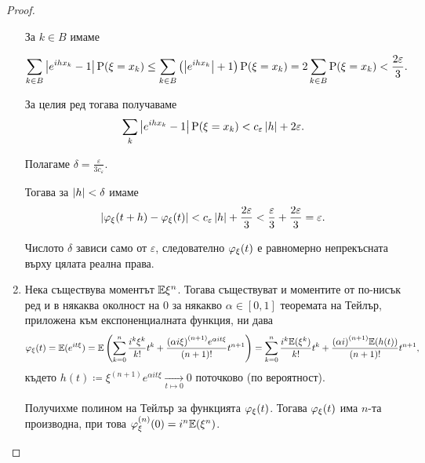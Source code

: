 \documentclass[numbers=endperiod, DIV=15, bibliography=totocnumbered]{scrartcl}
\begin{document}
\begin{proof}
\begin{enumerate}
    За $k \in B$ имаме

    \begin{displaymath}
      \sum_{k \in B} \left\vert e^{ih x_k} - 1 \right\vert \operatorname{P}(\xi = x_k)
      \leq
      \sum_{k \in B} \left( \left\vert e^{ih x_k} \right\vert + 1 \right) \operatorname{P}(\xi = x_k)
      =
      2 \sum_{k \in B} \operatorname{P}(\xi = x_k)
      <
      \frac {2\varepsilon} 3.
    \end{displaymath}

    За целия ред тогава получаваме
    \begin{displaymath}
      \sum_k \left\vert e^{ih x_k} - 1 \right\vert \operatorname{P}(\xi = x_k)
      <
      c_\varepsilon \left\vert h \right\vert + 2 \varepsilon.
    \end{displaymath}

    Полагаме $\delta = \frac \varepsilon {3 c_\varepsilon}$.

    Тогава за $\left\vert h \right\vert < \delta$ имаме
    \begin{displaymath}
      \left\vert \varphi_\xi(t + h) - \varphi_\xi(t) \right\vert
      <
      c_\varepsilon \left\vert h \right\vert + \frac {2\varepsilon} 3
      <
      \frac {\varepsilon} 3 + \frac {2\varepsilon} 3
      =
      \varepsilon.
    \end{displaymath}

    Числото $\delta$ зависи само от $\varepsilon$, следователно $\varphi_\xi(t)$ е равномерно непрекъсната върху цялата реална права.

    \item Нека съществува моментът $\mathbb{E} \xi^n$. Тогава съществуват и моментите от по-нисък ред и в някаква околност на $0$ за някакво $\alpha \in [0, 1]$ теоремата на Тейлър, приложена към експоненциалната функция, ни дава
    \begin{displaymath}
      \varphi_\xi(t)
      =
      \mathbb{E}(e^{it\xi})
      =
      \mathbb{E}\left(\sum_{k=0}^n \frac {i^k \xi^k} {k!} t^k + \frac {{(\alpha i \xi)}^{(n+1)} e^{\alpha it \xi}} {(n+1)!} t^{n+1} \right)
      =
      \sum_{k=0}^n \frac {i^k \mathbb{E}(\xi^k)} {k!} t^k + \frac {{(\alpha i)}^{(n+1)} \mathbb{E}(h(t))} {(n+1)!} t^{n+1},
    \end{displaymath}
    където $h(t) \coloneqq \xi^{(n+1)} e^{\alpha it \xi} \underset {t \mapsto 0} \longrightarrow 0$ поточково (по вероятност).

    Получихме полином на Тейлър за функцията $\varphi_\xi(t)$. Тогава $\varphi_\xi(t)$ има $n$-та производна, при това $\varphi^{(n)}_\xi(0) = i^n \mathbb{E}(\xi^n)$.


\end{enumerate}
\end{proof}
\end{document}
